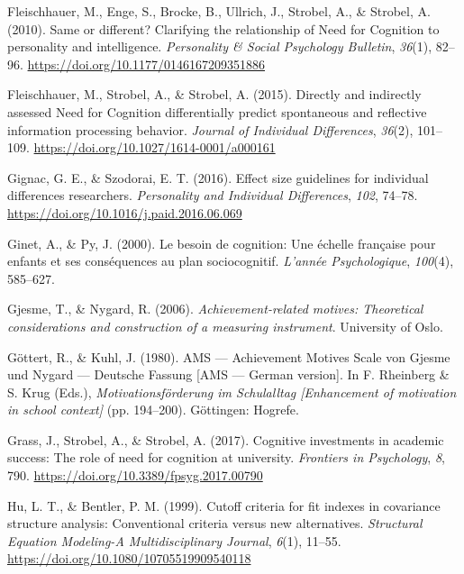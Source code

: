 \documentclass[
  man]{apa6}
\newlength{\cslhangindent}
\newlength{\cslentryspacingunit} %
\newenvironment{CSLReferences}[2] %
 {%
  \setlength{\parindent}{0pt}
  \ifodd #1
  \let\oldpar\par
  \def\par{\hangindent=\cslhangindent\oldpar}
  \fi
  \setlength{\parskip}{#2\cslentryspacingunit}
 }%
 {}
\begin{document}
\begin{CSLReferences}{1}{0}
\leavevmode{}%
Fleischhauer, M., Enge, S., Brocke, B., Ullrich, J., Strobel, A., \& Strobel, A. (2010). Same or different? Clarifying the relationship of {N}eed for {C}ognition to personality and intelligence. \emph{Personality \& Social Psychology Bulletin}, \emph{36}(1), 82--96. \url{https://doi.org/10.1177/0146167209351886}

\leavevmode{}%
Fleischhauer, M., Strobel, A., \& Strobel, A. (2015). Directly and indirectly assessed {N}eed for {C}ognition differentially predict spontaneous and reflective information processing behavior. \emph{Journal of Individual Differences}, \emph{36}(2), 101--109. \url{https://doi.org/10.1027/1614-0001/a000161}

\leavevmode{}%
Gignac, G. E., \& Szodorai, E. T. (2016). Effect size guidelines for individual differences researchers. \emph{Personality and Individual Differences}, \emph{102}, 74--78. \url{https://doi.org/10.1016/j.paid.2016.06.069}

\leavevmode{}%
Ginet, A., \& Py, J. (2000). Le besoin de cognition: Une {é}chelle fran{ç}aise pour enfants et ses cons{é}quences au plan sociocognitif. \emph{L'ann{é}e Psychologique}, \emph{100}(4), 585--627.

\leavevmode{}%
Gjesme, T., \& Nygard, R. (2006). \emph{Achievement-related motives: Theoretical considerations and construction of a measuring instrument}. University of Oslo.

\leavevmode{}%
Göttert, R., \& Kuhl, J. (1980). AMS --- {A}chievement {M}otives {S}cale von {G}jesme und {N}ygard --- {D}eutsche {F}assung {[}{AMS} --- {G}erman version{]}. In F. Rheinberg \& S. Krug (Eds.), \emph{Motivationsf{ö}rderung im {S}chulalltag {[}{E}nhancement of motivation in school context{]}} (pp. 194--200). G{ö}ttingen: Hogrefe.

\leavevmode{}%
Grass, J., Strobel, A., \& Strobel, A. (2017). Cognitive investments in academic success: The role of need for cognition at university. \emph{Frontiers in Psychology}, \emph{8}, 790. \url{https://doi.org/10.3389/fpsyg.2017.00790}

\leavevmode{}%
Hu, L. T., \& Bentler, P. M. (1999). Cutoff criteria for fit indexes in covariance structure analysis: Conventional criteria versus new alternatives. \emph{Structural Equation Modeling-A Multidisciplinary Journal}, \emph{6}(1), 11--55. \url{https://doi.org/10.1080/10705519909540118}


\end{CSLReferences}
\end{document}
